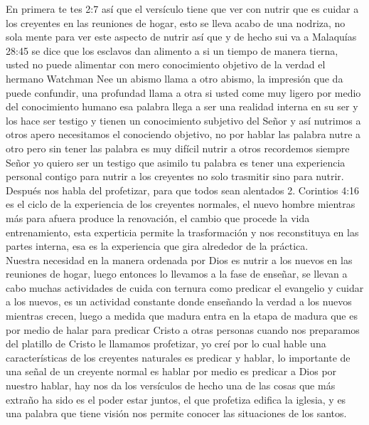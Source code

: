 \documentclass[12pt]{article}
\begin{document}
En primera te tes 2:7 así que el versículo tiene que ver con nutrir que es cuidar a los creyentes en las reuniones de hogar, esto se lleva acabo de una nodriza, no sola mente para ver este aspecto de nutrir así que y de hecho sui va a Malaquías 28:45 se dice que los esclavos dan alimento a si un tiempo de manera tierna, usted no puede alimentar con mero conocimiento objetivo de la verdad el hermano Watchman Nee un abismo llama a otro abismo, la impresión que da puede confundir, una profundad llama a otra si usted come muy ligero por medio del conocimiento humano esa palabra llega a ser una realidad interna en su ser y los hace ser testigo y tienen un conocimiento subjetivo del Señor y así nutrimos a otros apero necesitamos el conociendo objetivo, no por hablar las palabra nutre a otro pero sin tener las palabra es muy difícil nutrir a otros recordemos siempre Señor yo quiero ser un testigo que asimilo tu palabra es tener una experiencia personal contigo para nutrir a los creyentes no solo trasmitir sino para nutrir.\\

Después nos habla del profetizar, para que todos sean alentados 2. Corintios 4:16 es el ciclo de la experiencia de los creyentes normales, el nuevo hombre mientras más para afuera produce la renovación, el cambio que procede la vida entrenamiento, esta experticia permite la trasformación y nos reconstituya en las partes interna, esa es la experiencia que gira alrededor de la práctica.\\

Nuestra necesidad en la manera ordenada por Dios es nutrir a los nuevos en las reuniones de hogar, luego entonces lo llevamos a la fase de enseñar, se llevan a cabo muchas actividades de cuida con ternura como predicar el evangelio y cuidar a los nuevos, es un actividad constante donde enseñando la verdad a los nuevos mientras crecen, luego a medida que madura entra en la etapa de madura que es por medio de halar para predicar Cristo a otras personas cuando nos preparamos del platillo de Cristo le llamamos profetizar, yo creí por lo cual hable una características de los creyentes naturales es predicar y hablar, lo importante de una señal de un creyente normal es hablar por medio es predicar a Dios por nuestro hablar, hay nos da los versículos de hecho una de las cosas que más extraño ha sido es el poder estar juntos, el que profetiza edifica la iglesia, y es una palabra que tiene visión nos permite conocer las situaciones de los santos.\\
\end{document}
